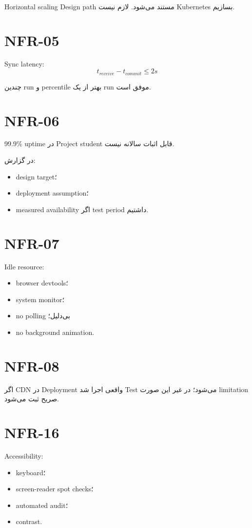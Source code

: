 Horizontal scaling Design path مستند می‌شود. لازم نیست Kubernetes بسازیم.

\section{NFR-05}

Sync latency:
\[
t_{receive}-t_{commit} \le 2s
\]

چندین run و percentile بهتر از یک run موفق است.

\section{NFR-06}

99.9\% uptime در Project student قابل اثبات سالانه نیست.

در گزارش:
\begin{itemize}
  \item design target؛
  \item deployment assumption؛
  \item measured availability اگر test period داشتیم.
\end{itemize}

\section{NFR-07}

Idle resource:
\begin{itemize}
  \item browser devtools؛
  \item system monitor؛
  \item no polling بی‌دلیل؛
  \item no background animation.
\end{itemize}

\section{NFR-08}

اگر CDN در Deployment واقعی اجرا شد Test می‌شود؛ در غیر این صورت limitation صریح ثبت می‌شود.

\section{NFR-16}

Accessibility:
\begin{itemize}
  \item keyboard؛
  \item screen-reader spot checks؛
  \item automated audit؛
  \item contrast.
\end{itemize}

